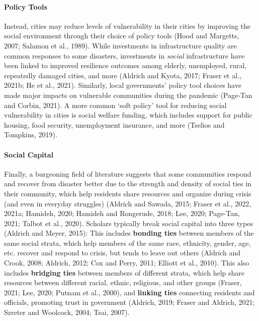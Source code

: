\documentclass[]{elsarticle} %
\begin{document}
\hypertarget{policy-tools}{%
\paragraph{Policy Tools}\label{policy-tools}}

Instead, cities may reduce levels of vulnerability in their cities by
improving the social environment through their choice of policy tools
(Hood and Margetts, 2007; Salamon et al., 1989). While investments in
infrastructure quality are common responses to some disasters,
investments in \emph{social} infrastructure have been linked to improved
resilience outcomes among elderly, unemployed, rural, repeatedly damaged
cities, and more (Aldrich and Kyota, 2017; Fraser et al., 2021b; He et
al., 2021). Similarly, local governments' policy tool choices have made
major impacts on vulnerable communities during the pandemic (Page-Tan
and Corbin, 2021). A more common `soft policy' tool for reducing social
vulnerability in cities is social welfare funding, which includes
support for public housing, food security, unemployment insurance, and
more (Tselios and Tompkins, 2019).

\hypertarget{social-capital}{%
\paragraph{Social Capital}\label{social-capital}}

Finally, a burgeoning field of literature suggests that some communities
respond and recover from disaster better due to the strength and density
of social ties in their community, which help residents share resources
and organize during crisis (and even in everyday struggles) (Aldrich and
Sawada, 2015; Fraser et al., 2022, 2021a; Hamideh, 2020; Hamideh and
Rongerude, 2018; Lee, 2020; Page-Tan, 2021; Talbot et al., 2020).
Scholars typically break social capital into three types (Aldrich and
Meyer, 2015): This includes \textbf{bonding ties} between members of the
same social strata, which help members of the same race, ethnicity,
gender, age, etc. recover and respond to crisis, but tends to leave out
others (Aldrich and Crook, 2008; Aldrich, 2012; Cox and Perry, 2011;
Elliott et al., 2010). This also includes \textbf{bridging ties} between
members of different strata, which help share resources between
different racial, ethnic, religious, and other groups (Fraser, 2021;
Lee, 2020; Putnam et al., 2000), and \textbf{linking ties} connecting
residents and officials, promoting trust in government (Aldrich, 2019;
Fraser and Aldrich, 2021; Szreter and Woolcock, 2004; Tsai, 2007).
\end{document}
